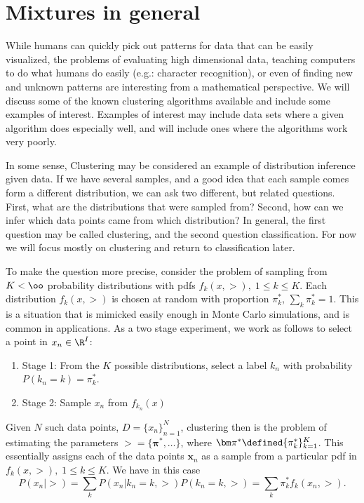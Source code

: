 \section{Mixtures in general}\label{sec1}
 While humans can quickly pick out patterns for data that can be easily visualized, the problems of evaluating high dimensional data, teaching computers to do what humans do easily (e.g.: character recognition), or even of finding new and unknown patterns are interesting from a mathematical perspective.  We will discuss some of the known clustering algorithms available and include some examples of interest.  Examples of interest may include data sets where a given algorithm does especially well, and will include ones where the algorithms work very poorly.
 
In some sense, Clustering may be considered an example of distribution inference given data.  If we have several samples, and a good idea that each sample comes form a different distribution, we can ask two different, but related questions.  First, what are the distributions that were sampled from?  Second, how can we infer which data points came from which distribution? In general, the first question may be called clustering, and the second question classification. For now we will focus mostly on clustering and return to classification later.

To make the question more precise, consider the problem of sampling from $K<\oo$ probability distributions with pdfs \(f_k(x,\gt),\; 1\leq k\leq K\). Each distribution $f_k(x,\gt)$ is chosen at random with proportion $\pi_k^\ast$, $\sum_k \pi_k^\ast=1$.  This is a situation that is mimicked easily enough in Monte Carlo simulations, and is common in applications.  As a two stage experiment, we work as follows to select a point in $x_n\in\R^I$:
\begin{enumerate}
\item Stage 1: From the $K$ possible distributions, select a label $k_n$ with probability $P(k_n=k)=\pi_{k}^\ast$.
\item Stage 2: Sample $x_n$ from $f_{k_n}(x)$
\end{enumerate}

Given $N$ such data points, $D=\{x_n\}_{n=1}^{N}$, clustering then is the problem of estimating the parameters $\gt=\{\bm\pi^\ast,\ldots\}$, where $\bm\pi^\ast\defined\{\pi_k^\ast\}_{k=1}^{K}$. This essentially assigns each of the data points $\bm x_n$ as a sample from a particular pdf in \(f_k(x,\gt),\; 1\leq k\leq K\).  We have in this case 
\[P(x_n|\gt)=\sum_k P(x_n|k_n=k,\gt) P(k_n=k, \gt)=\sum_k \pi_k^\ast f_k(x_n,\gt).\]

